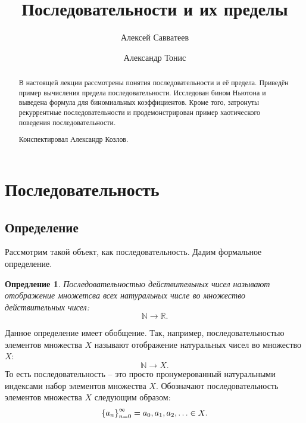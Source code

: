 \documentclass[12pt]{article}
\title{Последовательности и их пределы}
\author{Алексей Савватеев \and Александр Тонис}
\newtheorem{definition}{Опредление}[section]
\begin{document}
\maketitle
\begin{abstract}
В настоящей лекции рассмотрены понятия последовательности и её предела. Приведён пример вычисления предела последовательности. Исследован бином Ньютона и выведена формула для биномиальных коэффициентов. Кроме того, затронуты рекуррентные последовательности и продемонстрирован пример хаотического поведения последовательности. 
\par
Конспектировал Александр Козлов. 
\end{abstract}
\newpage
\tableofcontents
\newpage
\section{Последовательность}
\subsection{Определение}
Рассмотрим такой объект, как последовательность. Дадим формальное определение.
\begin{definition}
Последовательностью действительных чисел называют отображение множетсва всех натуральных числе во множество действительных чисел:
\begin{equation}
    \mathbb{N}\longrightarrow\mathbb{R}.
\end{equation}
\end{definition}
Данное определение имеет обобщение. Так, например, последовательностью элементов множества $X$ называют отображение натуральных чисел во множество $X$:
\begin{equation}
    \mathbb{N}\longrightarrow X.
\end{equation}
То есть последовательность -- это просто пронумерованный натуральными индексами набор элементов множества $X$. Обозначают последовательность элементов множества $X$ следующим образом:
\begin{equation}
    \qty{a_n}_{n=0}^\infty = a_0, a_1, a_2, \ldots \in X.
\end{equation}
\end{document}
